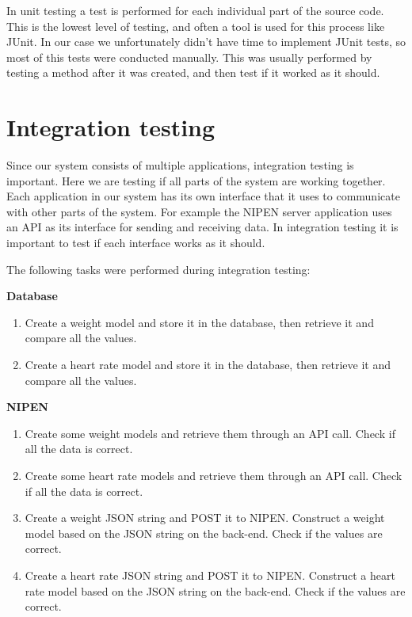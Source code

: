 In unit testing a test is performed for each individual part of the source code.
This is the lowest level of testing, and often a tool is used for this process like JUnit.
In our case we unfortunately didn't have time to implement JUnit tests, so most of this tests were conducted manually.
This was usually performed by testing a method after it was created, and then test if it worked as it should.

\section{Integration testing}

Since our system consists of multiple applications, integration testing is important.
Here we are testing if all parts of the system are working together.
Each application in our system has its own interface that it uses to communicate with other parts of the system.
For example the NIPEN server application uses an API as its interface for sending and receiving data.
In integration testing it is important to test if each interface works as it should.

The following tasks were performed during integration testing:

\textbf{Database}
\begin{enumerate}
\item Create a weight model and store it in the database, then retrieve it and compare all the values.
\item Create a heart rate model and store it in the database, then retrieve it and compare all the values.
\end{enumerate}

\textbf{NIPEN}
\begin{enumerate}
\item Create some weight models and retrieve them through an API call. Check if all the data is correct.
\item Create some heart rate models and retrieve them through an API call. Check if all the data is correct.
\item Create a weight JSON string and POST it to NIPEN. Construct a weight model based on the JSON string on the back-end. Check if the values are correct.
\item Create a heart rate JSON string and POST it to NIPEN. Construct a heart rate model based on the JSON string on the back-end. Check if the values are correct.
\end{enumerate}

